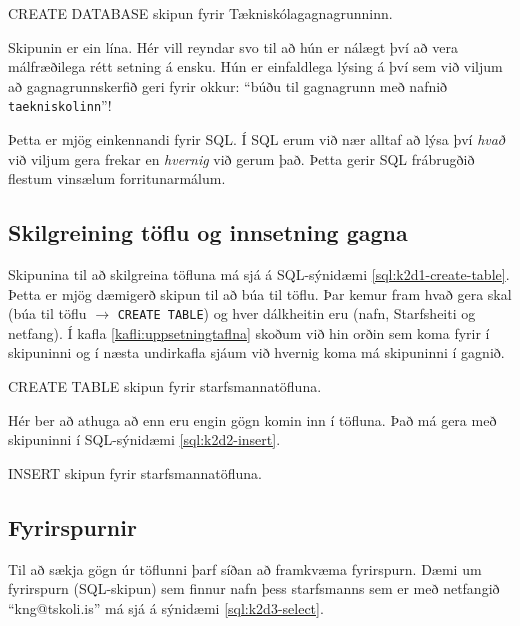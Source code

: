 \begin{example}
\caption{CREATE DATABASE skipun fyrir Tækniskólagagnagrunninn.}
\label{sql:k2d4-create-database}
\centering
{}
\end{example}

Skipunin er ein lína. Hér vill reyndar svo til að hún er nálægt því að vera málfræðilega rétt setning á ensku. Hún er einfaldlega lýsing á því sem við viljum að gagnagrunnskerfið geri fyrir okkur: ``búðu til gagnagrunn með nafnið \verb|taekniskolinn|''!

Þetta er mjög einkennandi fyrir SQL. Í SQL erum við nær alltaf að lýsa því \emph{hvað} við viljum gera frekar en \emph{hvernig} við gerum það. Þetta gerir SQL frábrugðið flestum vinsælum forritunarmálum.

\subsection{Skilgreining töflu og innsetning gagna}
Skipunina til að skilgreina töfluna má sjá á SQL-sýnidæmi \ref{sql:k2d1-create-table}. Þetta er mjög dæmigerð skipun til að búa til töflu. Þar kemur fram hvað gera skal (búa til töflu $\rightarrow$ \verb|CREATE TABLE|) og hver dálkheitin eru (nafn, Starfsheiti og netfang). Í kafla \ref{kafli:uppsetningtaflna} skoðum við hin orðin sem koma fyrir í skipuninni og í næsta undirkafla sjáum við hvernig koma má skipuninni í gagnið.

\begin{example}[h]
\caption{CREATE TABLE skipun fyrir starfsmannatöfluna.}
\label{sql:k2d1-create-table}
\centering
{}
\end{example}

Hér ber að athuga að enn eru engin gögn komin inn í töfluna. Það má gera með skipuninni í SQL-sýnidæmi \ref{sql:k2d2-insert}.

\begin{example}[h]
\caption{INSERT skipun fyrir starfsmannatöfluna.}
\label{sql:k2d2-insert}
\centering
{\small
{}
}
\end{example}

\subsection{Fyrirspurnir}
Til að sækja gögn úr töflunni þarf síðan að framkvæma fyrirspurn. Dæmi um fyrirspurn (SQL-skipun) sem finnur nafn þess starfsmanns sem er með netfangið ``kng@tskoli.is'' má sjá á sýnidæmi \ref{sql:k2d3-select}.

